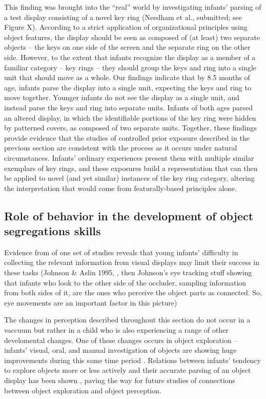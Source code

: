 This finding was brought into the ``real'' world by investigating
infants' parsing of a test display consisting of a novel key
ring (Needham et al., submitted; see Figure X).  According to a strict
application of organizational principles using object features, the
display should be seen as composed of (at least) two separate
objects -- the keys on one side of the screen and the separate
ring on the other side.  However, to the extent that infants recognize
the display as a member of a familiar category -- key
rings -- they should group the keys and ring into a single unit
that should move as a whole.  Our findings indicate that by 8.5 months
of age, infants parse the display into a single unit, expecting the
keys and ring to move together.  Younger infants do not see the
display as a single unit, and instead parse the keys and ring into
separate units.  Infants of both ages parsed an altered display, in
which the identifiable portions of the key ring were hidden by
patterned covers, as composed of two separate units.  Together, these
findings provide evidence that the studies of controlled prior
exposure described in the previous section are consistent with the
process as it occurs under natural circumstances.  Infants'
ordinary experiences present them with multiple similar exemplars of
key rings, and these exposures build a representation that can then be
applied to novel (and yet similar) instances of the key ring category,
altering the interpretation that would come from featurally-based
principles alone.




\subsection{Role of behavior in the development of object segregations skills}

Evidence from of one set of studies reveals that young
infants' difficulty in collecting the relevant information
from visual displays may limit their success in these tasks (Johnson \&
Aslin 1995, \cite{johnson96perception}, then Johnson's eye tracking stuff showing
that infants who look to the other side of the occluder, sampling
information from both sides of it, are the ones who perceive the
object parts as connected.  So, eye movements are an important factor
in this picture)

The changes in perception described throughout this section
do not occur in a vaccuum but rather in a
child who is also experiencing a range of other develomental changes.
One of these changes occurs in object
exploration -- infants' visual, oral, and manual
investigation of objects are showing huge improvements during this
same time period \cite{rochat89object}.  Relations between infants'
tendency to explore objects more or less actively and their accurate
parsing of an object display has been shown \cite{needham00improvements}, paving
the way for future studies of connections between object exploration
and object perception.





